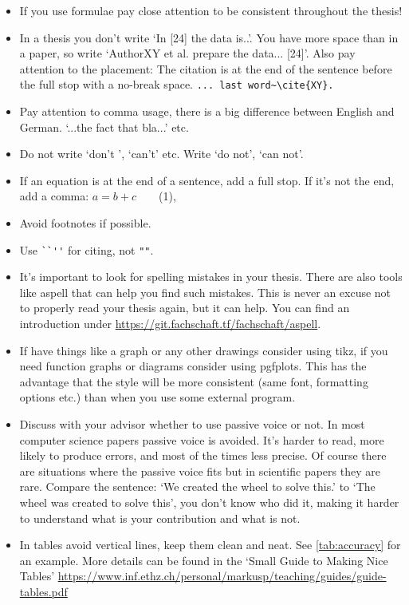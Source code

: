     \begin{itemize}

        \item If you use formulae pay close attention to be consistent throughout the thesis!

        \item In a thesis you don't write `In [24] the data is..'. You have more space than in a paper, so write `AuthorXY et al. prepare the data... [24]'. Also pay attention to the placement: The citation is at the end of the sentence before the full stop with a no-break space. \verb|... last word~\cite{XY}.|

        \item Pay attention to comma usage, there is a big difference between English and German. `...the fact that bla...' etc.

        \item Do not write `don't ', `can't' etc. Write `do not', `can not'.

        \item If an equation is at the end of a sentence, add a full stop. If it's not the end, add a comma: {$a= b + c$~~~~(1),}

        \item Avoid footnotes if possible.

        \item Use \verb|``''| for citing, not \verb|""|.

        \item It's important to look for spelling mistakes in your thesis. There are also tools like aspell that can help you find such mistakes.
        This is never an excuse not to properly read your thesis again, but it can help.
        You can find an introduction under \url{https://git.fachschaft.tf/fachschaft/aspell}.

        \item If have things like a graph or any other drawings consider using tikz, if you need function graphs or diagrams consider using pgfplots.
        This has the advantage that the style will be more consistent (same font, formatting options etc.) than when you use some external program.

        \item Discuss with your advisor whether to use passive voice or not. In most computer science papers passive voice is avoided. It's harder to read, more likely to produce errors, and most of the times less precise. Of course there are situations where the passive voice fits but in scientific papers they are rare. Compare the sentence: `We created the wheel to solve this.' to `The wheel was created to solve this', you don't know who did it, making it harder to understand what is your contribution and what is not.
        
        \item In tables avoid vertical lines, keep them clean and neat. See \ref{tab:accuracy} for an example. More details can be found in the `Small Guide to Making Nice Tables' \url{https://www.inf.ethz.ch/personal/markusp/teaching/guides/guide-tables.pdf}

    \end{itemize}


    
